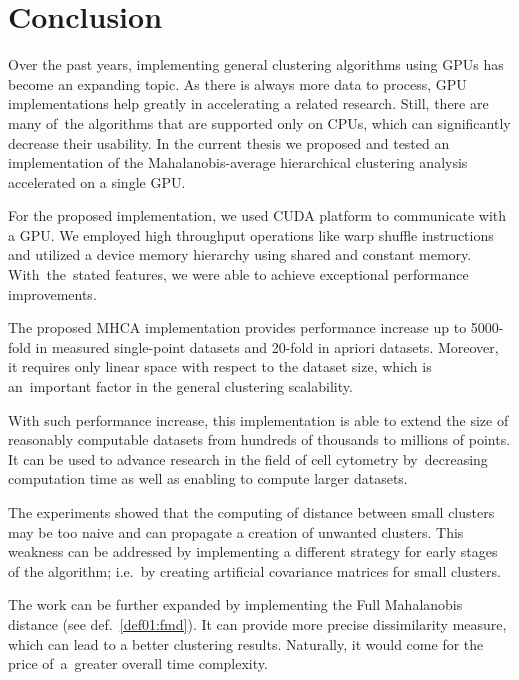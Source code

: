 \chapter*{Conclusion}

Over the past years, implementing general clustering algorithms using GPUs has become an expanding topic. As there is always more data to process, GPU implementations help greatly in accelerating a related research.  Still, there are many of~the algorithms that are supported only on CPUs, which can significantly decrease their usability. In the current thesis we proposed and tested an implementation of the Mahalanobis-average hierarchical clustering analysis accelerated on a single GPU. 

For the proposed implementation, we used CUDA platform to communicate with a GPU. We employed high throughput operations like warp shuffle instructions and utilized a device memory hierarchy using shared and constant memory. With~the~stated features, we were able to achieve exceptional performance improvements.

The proposed MHCA implementation provides performance increase up to 5000-fold in measured single-point datasets and 20-fold in apriori datasets. Moreover, it requires only linear space with respect to the dataset size, which is an~important factor in the general clustering scalability.

With such performance increase, this implementation is able to extend the size of reasonably computable datasets from hundreds of thousands to millions of points. It can be used to advance research in the field of cell cytometry by~decreasing computation time as well as enabling to compute larger datasets.

The experiments showed that the computing of distance between small clusters may be too naive and can propagate a creation of unwanted clusters. This weakness can be addressed by implementing a different strategy for early stages of the algorithm; i.e.~by creating artificial covariance matrices for small clusters.

The work can be further expanded by implementing the Full Mahalanobis distance (see def.~\ref{def01:fmd}). It can provide more precise dissimilarity measure, which can lead to a better clustering results. Naturally, it would come for the price of~a~greater overall time complexity. 